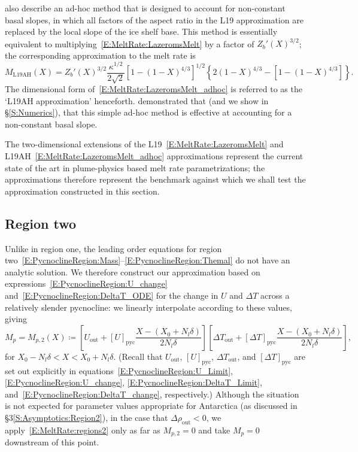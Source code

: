 \documentclass[openacc]{rsproca_new}%
\newcommand{\lt}{\delta} %
\newcommand{\out}{\text{out}}
\begin{document}
\citet{Lazeroms2019JPhysOcean} also describe an ad-hoc method that is designed to account for non-constant basal slopes, in which all factors of the aspect ratio in the L19 approximation are replaced by the local slope of the ice shelf base. This method is essentially equivalent to multiplying~\eqref{E:MeltRate:LazeromsMelt} by a factor of $Z_b'(X)^{3/2}$; the corresponding approximation to the melt rate is
\begin{equation}\label{E:MeltRate:LazeromsMelt_adhoc}
M_{\text{L19AH}}(X) =Z_b'(X)^{3/2} \frac{\kappa^{1/2}}{2\sqrt{2}}\left[1 - (1 - X)^{4/3}\right]^{1/2}\left\{2(1-X)^{4/3} - \left[1- (1 - X)^{4/3}\right]\right\}.
\end{equation}
The dimensional form of~\eqref{E:MeltRate:LazeromsMelt_adhoc} is referred to as the `L19AH approximation' henceforth. \citet{Lazeroms2019JPhysOcean} demonstrated that (and we show in \S\ref{S:Numerics}), that this simple ad-hoc method is effective at accounting for a non-constant basal slope.

The two-dimensional extensions of the L19~\eqref{E:MeltRate:LazeromsMelt} and L19AH~\eqref{E:MeltRate:LazeromsMelt_adhoc} approximations represent the current state of the art in plume-physics based melt rate parametrizations; the approximations therefore represent the benchmark against which we shall test the approximation constructed in this section.

\subsection{Region two}
Unlike in region one, the leading order equations for region two~\eqref{E:PycnoclineRegion:Mass}--\eqref{E:PycnoclineRegion:Themal} do not have an analytic solution. We therefore construct our approximation based on expressions~\eqref{E:PycnoclineRegion:U_change} and~\eqref{E:PycnoclineRegion:DeltaT_ODE} for the change in $U$ and $\Delta T$ across a relatively slender pycnocline: we linearly interpolate according to these values, giving
\begin{equation}\label{E:MeltRate:regions2}
M_{p} = M_{p,2}(X) \coloneqq \left[U_{\out} + \left[U\right]_{\text{pyc}} \frac{X - (X_0 + N_l \lt)}{2N_l \lt}\right]  \left[\Delta T_{\out} +  \left[\Delta T\right]_{\text{pyc}} \frac{X - (X_0 + N_l \lt)}{2N_l \lt}\right] , 
\end{equation}
for $ X_0 - N_l \lt  < X < X_0 + N_l \lt$. (Recall that $U_\out$, $\left[U\right]_{\text{pyc}}$, $\Delta T_\out$, and $\left[\Delta T\right]_{\text{pyc}}$ are set out explicitly in equations~\eqref{E:PycnoclineRegion:U_Limit}, \eqref{E:PycnoclineRegion:U_change}, \eqref{E:PycnoclineRegion:DeltaT_Limit}, and~\eqref{E:PycnoclineRegion:DeltaT_change}, respectively.) Although the situation is not expected for parameter values appropriate for Antarctica (as discussed in \S3\ref{S:Asymptotics:Region2}), in the case that $\Delta \rho_\out < 0$, we apply~\eqref{E:MeltRate:regions2} only as far as $M_{p,2} = 0$ and take $M_{p} = 0$ downstream of this point.
\end{document}
